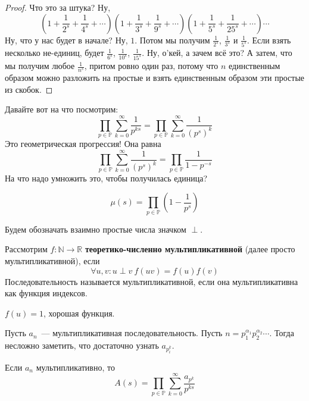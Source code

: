 \documentclass{article}
\begin{document}
    \begin{proof}
        Что это за штука? Ну,
        $$
        \left(1+\frac1{2^s}+\frac1{4^s}+\cdots\right)\left(1+\frac1{3^s}+\frac1{9^s}+\cdots\right)\left(1+\frac1{5^s}+\frac1{25^s}+\cdots\right)\cdots
        $$
        Ну, что у нас будет в начале? Ну, $1$. Потом мы получим $\frac1{2^s}$, $\frac1{3^s}$ и $\frac1{5^s}$. Если взять несколько не-единиц, будет $\frac1{6^s}$, $\frac1{10^s}$, $\frac1{15^s}$. Ну, о'кей, а зачем всё это? А затем, что мы получим любое $\frac1{n^s}$, притом ровно один раз, потому что $n$ единственным образом можно разложить на простые и взять единственным образом эти простые из скобок.
    \end{proof}
    \begin{remark}
        Давайте вот на что посмотрим:
        $$
        \prod\limits_{p\in\mathbb P}\sum\limits_{k=0}^\infty\frac1{p^{ks}}=\prod\limits_{p\in\mathbb P}\sum\limits_{k=0}^\infty\frac1{(p^s)^k}
        $$
        Это геометрическая прогрессия! Она равна
        $$
        \prod\limits_{p\in\mathbb P}\sum\limits_{k=0}^\infty\frac1{(p^s)^k}=\prod\limits_{p\in\mathbb P}\frac1{1-p^{-s}}
        $$
        На что надо умножить это, чтобы получилась единица?
    \end{remark}
    \begin{corollary}
        $$
        \mu(s)=\prod\limits_{p\in\mathbb P}\left(1-\frac1{p^s}\right)
        $$
    \end{corollary}
    \begin{definition}
        Будем обозначать взаимно простые числа значком $\perp$.
    \end{definition}
    \begin{definition}
        Рассмотрим $f\colon\mathbb N\to\mathbb R$ \textbf{теоретико-численно мультипликативной} (далее просто мультипликативной), если
        $$
        \forall u,v:u\perp v~f(uv)=f(u)f(v)
        $$
        Последовательность называется мультипликативной, если она мультипликативна как функция индексов.
    \end{definition}
    \begin{example}
        $f(u)=1$, хорошая функция.
    \end{example}
    \begin{remark}
        Пусть $a_n$~--- мультипликативная последовательность. Пусть $n=p_1^{\alpha_1}p_2^{\alpha_2}\cdots$. Тогда несложно заметить, что достаточно узнать $a_{p_i^k}$.
    \end{remark}
    \begin{theorem}
        Если $a_n$ мультипликативно, то
        $$
        A(s)=\prod\limits_{p\in\mathbb P}\sum\limits_{k=0}^\infty\frac{a_{p^k}}{p^{ks}}
        $$
    \end{theorem}
\end{document}
